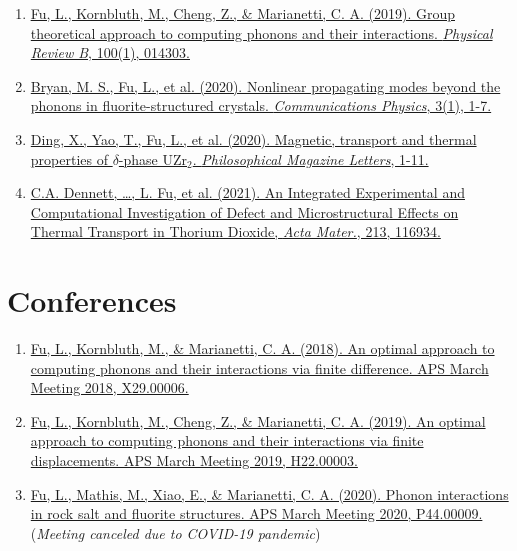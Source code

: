 \documentclass[
  a4paper,
  12pt
]{article}
\begin{document}
\begin{enumerate}
\item
\href{https://doi.org/10.1103/PhysRevB.100.014303}
{\underline{Fu, L.}, Kornbluth, M., Cheng, Z., \& Marianetti, C. A. (2019). 
Group theoretical approach to computing phonons and their interactions. 
\textit{Physical Review B}, 100(1), 014303.}
%
\item
\href{https://doi.org/10.1038/s42005-020-00483-2}{
Bryan, M. S., \underline{Fu, L.}, et al. (2020). 
Nonlinear propagating modes beyond the phonons in fluorite-structured crystals.
\textit{Communications Physics}, 3(1), 1-7.}
%
\item
\href{https://doi.org/10.1080/09500839.2020.1833375}{
Ding, X., Yao, T., \underline{Fu, L.}, et al. (2020).
Magnetic, transport and thermal properties of $\delta$-phase UZr$_{2}$.
\textit{Philosophical Magazine Letters}, 1-11.
}
%
\item
\href{https://doi.org/10.1016/j.actamat.2021.116934}{
C.A. Dennett, \dots, \underline{L. Fu}, et al. (2021).
An Integrated Experimental and Computational Investigation of Defect and Microstructural Effects on Thermal Transport in Thorium Dioxide, %
\textit{Acta Mater.}, 213, 116934.
}
%
\end{enumerate}


\section{Conferences}

\begin{enumerate}
\item
\href{https://meetings.aps.org/Meeting/MAR18/Event/322388}{
Fu, L., Kornbluth, M., \& Marianetti, C. A. (2018).
An optimal approach to computing phonons and their interactions via finite difference.
APS March Meeting 2018, X29.00006.
}
%
\item
\href{https://meetings.aps.org/Meeting/MAR19/Session/H22.3}{
Fu, L., Kornbluth, M., Cheng, Z., \& Marianetti, C. A. (2019).
An optimal approach to computing phonons and their interactions via finite displacements.
APS March Meeting 2019, H22.00003.
}
%
\item
\href{https://meetings.aps.org/Meeting/MAR20/Session/P44.9}{
Fu, L., Mathis, M., Xiao, E., \& Marianetti, C. A. (2020).
Phonon interactions in rock salt and fluorite structures.
APS March Meeting 2020, P44.00009.
} (\emph{Meeting canceled due to COVID-19 pandemic})
\end{enumerate}
\end{document}
